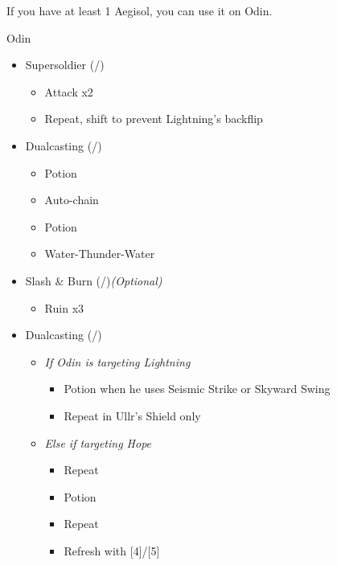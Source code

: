 \begin{multicols}{2}
	\renewcommand{\first}{[1] Slash \& Burn (\com/\rav)}
	\renewcommand{\second}{[2] Supersoldier (\com/\syn)}
	\renewcommand{\fourth}{[4] Dualcasting (\rav/\rav)}
	\renewcommand{\fifth}{[5] Dualcasting (\rav/\rav)}
	If you have at least 1 Aegisol, you can use it on Odin.
	\begin{battle}[0:52]{Odin}
		\begin{itemize}
			\item \second
			      \begin{itemize}
				      \item Attack x2
				      \item Repeat, shift to prevent Lightning's backflip
			      \end{itemize}
			\item \fourth
			      \begin{itemize}
				      \item Potion
				      \item Auto-chain
				      \item Potion
				      \item Water-Thunder-Water
			      \end{itemize}
			\item \first \textit{(Optional)}
			      \begin{itemize}
				      \item Ruin x3
			      \end{itemize}
			      \columnbreak
			\item \fifth
			      \begin{itemize}
				      \item \textit{If Odin is targeting Lightning}
				            \begin{itemize}
					            \item Potion when he uses Seismic Strike or Skyward Swing
					            \item Repeat in Ullr's Shield only
				            \end{itemize}
				      \item \textit{Else if targeting Hope}
				            \begin{itemize}
					            \item Repeat
					            \item Potion
					            \item Repeat
					            \item Refresh with [4]/[5]
				            \end{itemize}
			      \end{itemize}

\end{itemize}
\end{battle}
\end{multicols}
